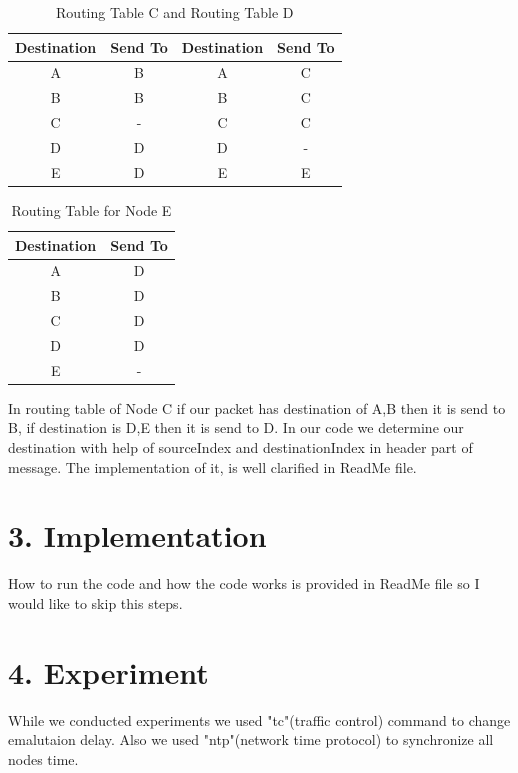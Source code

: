 \documentclass[12pt]{article}
\begin{document}
\begin{table}[h]
\small
	\centering 
	\caption{Routing Table C and Routing Table D}
	\label{table:example}
	\begin{tabular}{|c|c|c|c|}	%
	\hline 							%
	\textbf{Destination} & \textbf{Send To  } & \textbf{Destination} & \textbf{Send To}  \\
\hline 
\hline 
A & B & A & C   \\			%
B & B & B & C    \\
C & - & C & C  \\
D & D & D & -  \\
E & D & E & E  \\

\hline 
\end{tabular}
\end{table}

\begin{table}[h]
\small
\centering 
	\caption{ Routing Table for Node E }
	\label{table:example5}
	\begin{tabular}{|c|c|}	%
	\hline 							%
	\textbf{Destination} & \textbf{Send To}  \\
\hline 
\hline 
A & D   \\			%
B & D    \\
C & D  \\
D & D  \\
E & -  \\

\hline 
\end{tabular}
\end{table}

In routing table of Node C if our packet has destination of A,B then it is send to B, if destination is D,E then it is send to D. In our code we determine our destination with help of sourceIndex and destinationIndex in header part of message. The implementation of it, is well clarified in ReadMe file. 




\section*{3. Implementation}

How to run the code and how the code works is provided in ReadMe file so I would like to skip this steps.

\section*{4. Experiment}
While we conducted experiments we used "tc"(traffic control) command to change emalutaion delay. Also we used "ntp"(network time protocol) to synchronize all nodes time.
\end{document}
